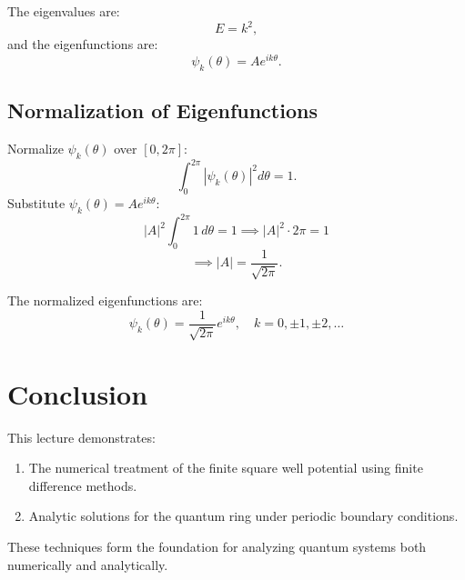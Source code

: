 \documentclass[a4paper,12pt]{article}
\begin{document}
\begin{multicols}{2}
The eigenvalues are:
\[
E = k^2,
\]
and the eigenfunctions are:
\[
\psi_k(\theta) = Ae^{ik\theta}.
\]

\subsection{Normalization of Eigenfunctions}
Normalize $\psi_k(\theta)$ over $[0, 2\pi]$:
\[
\int_0^{2\pi} |\psi_k(\theta)|^2 d\theta = 1.
\]
Substitute $\psi_k(\theta) = Ae^{ik\theta}$:
\[
|A|^2 \int_0^{2\pi} 1 \, d\theta = 1 \implies |A|^2 \cdot 2\pi = 1 
\]
\[
\implies |A| = \frac{1}{\sqrt{2\pi}}.
\]

The normalized eigenfunctions are:
\[
\psi_k(\theta) = \frac{1}{\sqrt{2\pi}} e^{ik\theta}, \quad k = 0, \pm 1, \pm 2, \dots
\]

\section*{Conclusion}
This lecture demonstrates:
\begin{enumerate}
    \item The numerical treatment of the finite square well potential using finite difference methods.
    \item Analytic solutions for the quantum ring under periodic boundary conditions.
\end{enumerate}

These techniques form the foundation for analyzing quantum systems both numerically and analytically.



\end{multicols}
\end{document}

